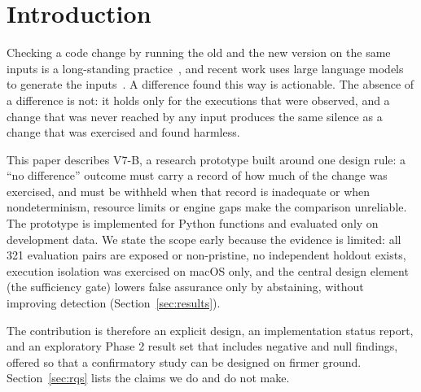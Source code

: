 \section{Introduction}\label{sec:intro}
Checking a code change by running the old and the new version on the same inputs is a long-standing practice~\cite{evans2007,palikareva2016,jin2010automated}, and recent work uses large language models to generate the inputs~\cite{etemadi2024mokav,pradel2025testora,hu2026difftestgen,liu2025evaluating}. A difference found this way is actionable. The absence of a difference is not: it holds only for the executions that were observed, and a change that was never reached by any input produces the same silence as a change that was exercised and found harmless.

This paper describes V7-B, a research prototype built around one design rule: a ``no difference'' outcome must carry a record of how much of the change was exercised, and must be withheld when that record is inadequate or when nondeterminism, resource limits or engine gaps make the comparison unreliable. The prototype is implemented for Python functions and evaluated only on development data. We state the scope early because the evidence is limited: all 321 evaluation pairs are exposed or non-pristine, no independent holdout exists, execution isolation was exercised on macOS only, and the central design element (the sufficiency gate) lowers false assurance only by abstaining, without improving detection (Section~\ref{sec:results}).

The contribution is therefore an explicit design, an implementation status report, and an exploratory Phase 2 result set that includes negative and null findings, offered so that a confirmatory study can be designed on firmer ground. Section~\ref{sec:rqs} lists the claims we do and do not make.
